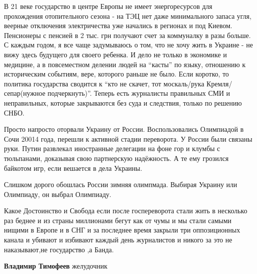\begin{itemize}

В 21 веке государство в центре Европы не имеет энергоресурсов для прохождения
отопительного сезона - на ТЭЦ нет даже минимального запаса угля, веерные
отключения электричества уже начались в регионах и под Киевом. Пенсионеры с
пенсией в 2 тыс. грн получают счет за коммуналку в разы больше. С каждым годом,
я все чаще задумываюсь о том, что не хочу жить в Украине - не вижу здесь
будущего для своего ребенка. И дело не только в экономике и медицине, а в
повсеместном делении людей на \enquote{касты} по языку, отношению к историческим
событиям, вере, которого раньше не было. Если коротко, то политика государства
сводится к \enquote{кто не скачет, тот москаль/рука Кремля/сепар(нужное
подчеркнуть)}. Теперь есть журналисты правильных СМИ и неправильных, которые
закрываются без суда и следствия, только по решению СНБО.



Просто напросто оторвали Украину от России. Воспользовались Олимпиадой в Сочи
20014 года, перешли к активной стадии переворота. У России были связаны руки.
Путин развлекал иностранные делегации на фоне гор и клумбы с тюльпанами,
доказывая свою партнерскую надёжность. А те ему грозился байкотом игр, если
вешается в дела Украины.

Слишком дорого обошлась России зимняя олимпмада. Выбирая Украину или Олимпиаду,
он выбрал Олимпиаду.


Какое Достоинство и Свобода если после госпереворота стали жить в несколько раз
беднее и из страны миллионами бегут как от чумы и мы стали самыми нищими в
Европе и в СНГ и за последнее время закрыли три оппозиционных канала и убивают
и избивают каждый день журналистов и никого за это не наказывают,не государство
,а Банда.

\textbf{Владимир Тимофеев} желудочник

\end{itemize} %
